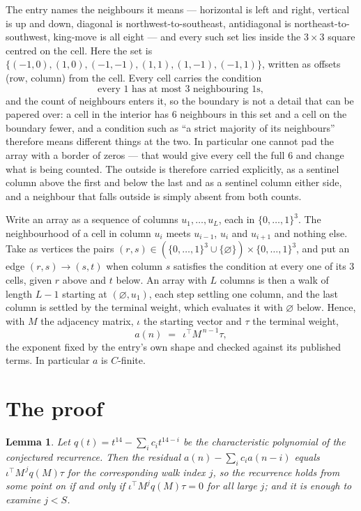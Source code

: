 \documentclass[11pt,a4paper]{article}
\theoremstyle{plain}
\newtheorem{lemma}[theorem]{Lemma}
\theoremstyle{definition}
\begin{document}
The entry names the neighbours it means --- horizontal is left and right, vertical is up and
down, diagonal is northwest-to-southeast, antidiagonal is northeast-to-southwest, king-move is
all eight --- and every such set lies inside the $3\times3$ square centred on the cell. Here
the set is $\{(-1,0), (1,0), (-1,-1), (1,1), (1,-1), (-1,1)\}$, written as offsets (row, column) from the cell. Every cell carries
the condition
\[
\text{every 1 has at most 3 neighbouring 1s},
\]
and the count of neighbours enters it, so the boundary is not a detail that can be papered
over: a cell in the interior has $6$ neighbours in this set and a cell on the boundary
fewer, and a condition such as ``a strict majority of its neighbours'' therefore means
different things at the two. In particular one cannot pad the array with a border of zeros ---
that would give every cell the full $6$ and change what is being counted. The outside is
therefore carried
explicitly, as a sentinel column above the first and below the last and as a sentinel column
either side, and a neighbour that falls outside is simply absent from both counts.

Write an array as a sequence of columns $u_1,\dots,u_L$, each in
$\{0,\dots,1\}^{3}$. The neighbourhood of a cell in column $u_i$ meets $u_{i-1}$,
$u_i$ and $u_{i+1}$ and nothing else. Take as vertices the pairs
$(r,s)\in(\{0,\dots,1\}^{3}\cup\{\varnothing\})\times\{0,\dots,1\}^{3}$,
and put an edge $(r,s)\to(s,t)$ when column $s$ satisfies the condition at every one of its
$3$ cells, given $r$ above and $t$ below. An array with $L$ columns is then a walk of length
$L-1$ starting at $(\varnothing,u_1)$, each step settling one column, and the last column is
settled by the terminal weight, which evaluates it with $\varnothing$ below. Hence,
with $M$ the adjacency matrix, $\iota$ the starting vector and $\tau$ the terminal weight,
\[
a(n)\;=\;\,\iota^{\!\top}M^{\,n-1}\tau ,
\]
the exponent fixed by the entry's own shape and checked against its published terms. In
particular $a$ is $C$-finite.

\section{The proof}

\begin{lemma}\label{lem:crit}
Let $q(t)=t^{14}-\sum_i c_it^{14-i}$ be the characteristic polynomial of the
conjectured recurrence. Then the residual $a(n)-\sum_ic_ia(n-i)$ equals
$\iota^{\!\top}M^{\,j}q(M)\tau$ for the corresponding walk index $j$, so the
recurrence holds from some point on if and only if $\iota^{\!\top}M^{j}q(M)\tau=0$ for all
large $j$; and it is enough to examine $j<S$.
\end{lemma}
\end{document}
